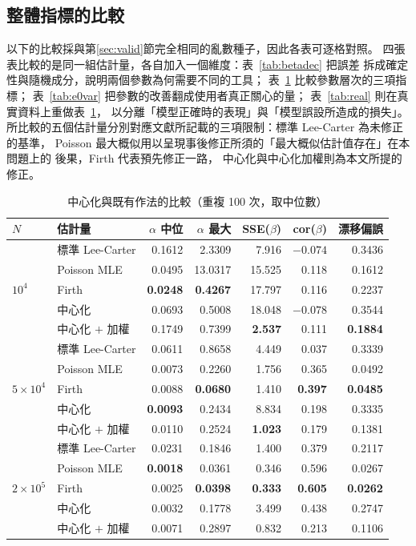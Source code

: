 \documentclass[UTF8, fontset=macnew, a4paper, 12pt]{ctexart}
\begin{document}
\subsection{整體指標的比較}\label{sec:empmain}

以下的比較採與第\ref{sec:valid}節完全相同的亂數種子，因此各表可逐格對照。
四張表比較的是同一組估計量，各自加入一個維度：表~\ref{tab:betadec} 把誤差
拆成確定性與隨機成分，說明兩個參數為何需要不同的工具；
表~\ref{tab:estcmp} 比較參數層次的三項指標；
表~\ref{tab:e0var} 把參數的改善翻成使用者真正關心的量；
表~\ref{tab:real} 則在真實資料上重做表~\ref{tab:estcmp}，
以分離「模型正確時的表現」與「模型誤設所造成的損失」。
所比較的五個估計量分別對應文獻所記載的三項限制：標準 Lee-Carter 為未修正的基準，
Poisson 最大概似用以呈現事後修正所須的「最大概似估計值存在」在本問題上的
後果，Firth 代表預先修正一路，
中心化與中心化加權則為本文所提的修正。

\begin{table}[H]
\centering
\caption{中心化與既有作法的比較（重複 100 次，取中位數）}
\small
\begin{tabular}{llrrrrr}
\toprule
$N$ & 估計量 & $\alpha$ 中位 & $\alpha$ 最大 & SSE($\beta$) & cor($\beta$) & 漂移偏誤\\
\midrule
\multirow{5}{*}{$10^4$}
 & 標準 Lee-Carter          & 0.1612 & 2.3309 & 7.916 & $-0.074$ & 0.3436\\
 & Poisson MLE       & 0.0495 & 13.0317 & 15.525 & 0.118 & 0.1612\\
 & Firth            & \textbf{0.0248} & \textbf{0.4267} & 17.797 & 0.116 & 0.2237\\
 & 中心化           & 0.0693 & 0.5008 & 18.048 & $-0.078$ & 0.3544\\
 & 中心化 $+$ 加權   & 0.1749 & 0.7399 & \textbf{2.537} & 0.111 & \textbf{0.1884}\\
\midrule
\multirow{5}{*}{$5\times10^4$}
 & 標準 Lee-Carter          & 0.0611 & 0.8658 & 4.449 & 0.037 & 0.3339\\
 & Poisson MLE       & 0.0073 & 0.2260 & 1.756 & 0.365 & 0.0492\\
 & Firth            & 0.0088 & \textbf{0.0680} & 1.410 & \textbf{0.397} & \textbf{0.0485}\\
 & 中心化           & \textbf{0.0093} & 0.2434 & 8.834 & 0.198 & 0.3335\\
 & 中心化 $+$ 加權   & 0.0110 & 0.2524 & \textbf{1.023} & 0.179 & 0.1381\\
\midrule
\multirow{5}{*}{$2\times10^5$}
 & 標準 Lee-Carter          & 0.0231 & 0.1846 & 1.400 & 0.379 & 0.2117\\
 & Poisson MLE       & \textbf{0.0018} & 0.0361 & 0.346 & 0.596 & 0.0267\\
 & Firth            & 0.0025 & \textbf{0.0398} & \textbf{0.333} & \textbf{0.605} & \textbf{0.0262}\\
 & 中心化           & 0.0032 & 0.1778 & 3.499 & 0.438 & 0.2747\\
 & 中心化 $+$ 加權   & 0.0071 & 0.2897 & 0.832 & 0.213 & 0.1106\\
\bottomrule
\end{tabular}
\label{tab:estcmp}
\end{table}
\end{document}
